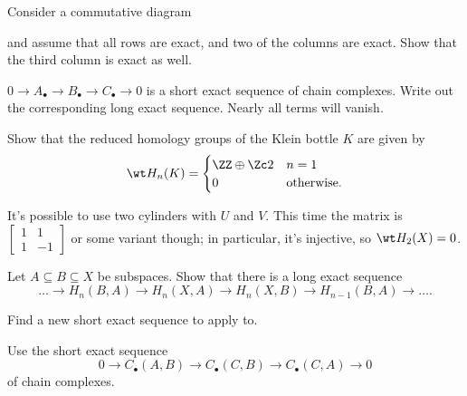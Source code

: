 \begin{problem}
	Consider a commutative diagram
	\begin{center}
	\end{center}
	and assume that all rows are exact,
	and two of the columns are exact.
	Show that the third column is exact as well.
	\begin{hint}
		$0 \to A_\bullet \to B_\bullet \to C_\bullet \to 0$
		is a short exact sequence of chain complexes.
		Write out the corresponding long exact sequence.
		Nearly all terms will vanish.
	\end{hint}
\end{problem}

\begin{sproblem}
	\gim
	Show that the reduced homology groups of the Klein bottle $K$ are given by
	\[
		\wt H_n(K) =
		\begin{cases}
			\ZZ \oplus \Zc 2 & n = 1 \\
			0 & \text{otherwise}.
		\end{cases}
	\]
	\begin{hint}
		It's possible to use two cylinders with $U$ and $V$.
		This time the matrix is $\begin{bmatrix} 1 & 1 \\ 1 & -1 \end{bmatrix}$
		or some variant though; in particular, it's injective, so $\wt H_2(X) = 0$.
	\end{hint}
\end{sproblem}

\begin{sproblem}
	\label{prob:triple_long_exact}
	Let $A \subseteq B \subseteq X$ be subspaces.
	Show that there is a long exact sequence
	\[
		\dots \to H_n(B,A) \to H_n(X,A)
		\to H_n(X,B) \to H_{n-1}(B,A) \to \dots.
	\]
	\begin{hint}
		Find a new short exact sequence
		to apply  to.
	\end{hint}
	\begin{sol}
		Use the short exact sequence
		\[ 0 \to C_\bullet(A,B) \to C_\bullet(C,B) \to C_\bullet(C,A) \to 0 \]
		of chain complexes.
	\end{sol}
\end{sproblem}
